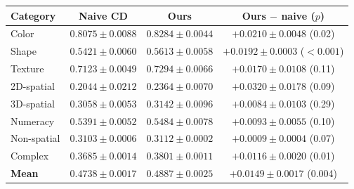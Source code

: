 \begin{tabular}{l c c c}
\toprule
Category & Naive CD & Ours & Ours $-$ naive ($p$) \\
\midrule
Color & $0.8075\pm0.0088$ & $0.8284\pm0.0044$ & $+0.0210\pm0.0048$ (0.02) \\
Shape & $0.5421\pm0.0060$ & $0.5613\pm0.0058$ & $+0.0192\pm0.0003$ ($<0.001$) \\
Texture & $0.7123\pm0.0049$ & $0.7294\pm0.0066$ & $+0.0170\pm0.0108$ (0.11) \\
2D-spatial & $0.2044\pm0.0212$ & $0.2364\pm0.0070$ & $+0.0320\pm0.0178$ (0.09) \\
3D-spatial & $0.3058\pm0.0053$ & $0.3142\pm0.0096$ & $+0.0084\pm0.0103$ (0.29) \\
Numeracy & $0.5391\pm0.0052$ & $0.5484\pm0.0078$ & $+0.0093\pm0.0055$ (0.10) \\
Non-spatial & $0.3103\pm0.0006$ & $0.3112\pm0.0002$ & $+0.0009\pm0.0004$ (0.07) \\
Complex & $0.3685\pm0.0014$ & $0.3801\pm0.0011$ & $+0.0116\pm0.0020$ (0.01) \\
\midrule
\textbf{Mean} & $0.4738\pm0.0017$ & $0.4887\pm0.0025$ & $+0.0149\pm0.0017$ (0.004) \\
\bottomrule
\end{tabular}